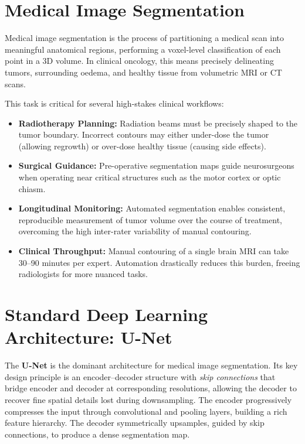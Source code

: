 \documentclass[12pt,a4paper]{report}
\begin{document}
\section{Medical Image Segmentation}

Medical image segmentation is the process of partitioning a medical scan into meaningful anatomical regions, performing a voxel-level classification of each point in a 3D volume. In clinical oncology, this means precisely delineating tumors, surrounding oedema, and healthy tissue from volumetric MRI or CT scans.

This task is critical for several high-stakes clinical workflows:
\begin{itemize}[leftmargin=*]
    \item \textbf{Radiotherapy Planning:} Radiation beams must be precisely shaped to the tumor boundary. Incorrect contours may either under-dose the tumor (allowing regrowth) or over-dose healthy tissue (causing side effects).
    \item \textbf{Surgical Guidance:} Pre-operative segmentation maps guide neurosurgeons when operating near critical structures such as the motor cortex or optic chiasm.
    \item \textbf{Longitudinal Monitoring:} Automated segmentation enables consistent, reproducible measurement of tumor volume over the course of treatment, overcoming the high inter-rater variability of manual contouring.
    \item \textbf{Clinical Throughput:} Manual contouring of a single brain MRI can take 30--90 minutes per expert. Automation drastically reduces this burden, freeing radiologists for more nuanced tasks.
\end{itemize}

\section{Standard Deep Learning Architecture: U-Net}

The \textbf{U-Net} \cite{ronneberger2015} is the dominant architecture for medical image segmentation. Its key design principle is an encoder--decoder structure with \textit{skip connections} that bridge encoder and decoder at corresponding resolutions, allowing the decoder to recover fine spatial details lost during downsampling. The encoder progressively compresses the input through convolutional and pooling layers, building a rich feature hierarchy. The decoder symmetrically upsamples, guided by skip connections, to produce a dense segmentation map.
\end{document}

